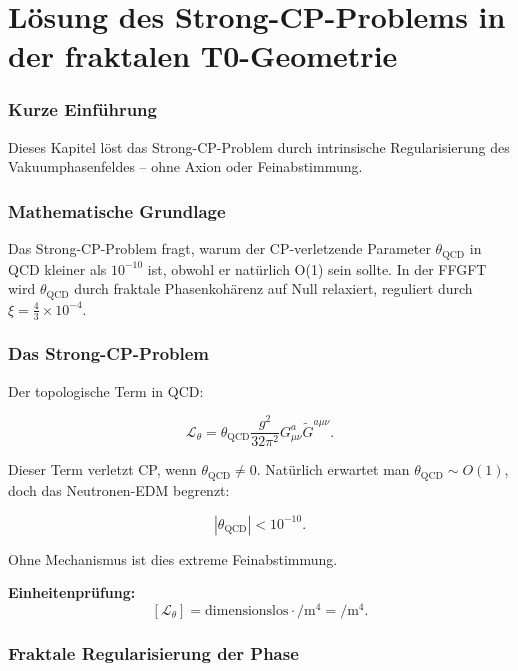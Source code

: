\chapter{Lösung des Strong-CP-Problems in der fraktalen T0-Geometrie}


	
	\subsection*{Kurze Einführung}
	
	Dieses Kapitel löst das Strong-CP-Problem durch intrinsische Regularisierung des Vakuumphasenfeldes – ohne Axion oder Feinabstimmung.
	
	\subsection*{Mathematische Grundlage}
	
	Das Strong-CP-Problem fragt, warum der CP-verletzende Parameter \(\theta_{\text{QCD}}\) in QCD kleiner als \(10^{-10}\) ist, obwohl er natürlich O(1) sein sollte. In der FFGFT wird \(\theta_{\text{QCD}}\) durch fraktale Phasenkohärenz auf Null relaxiert, reguliert durch \(\xi = \frac{4}{3} \times 10^{-4}\).
	
	\subsection*{Das Strong-CP-Problem}
	
	Der topologische Term in QCD:
	
	\begin{equation}
		\mathcal{L}_{\theta} = \theta_{\text{QCD}} \frac{g^2}{32\pi^2} G^a_{\mu\nu} \tilde{G}^{a\mu\nu}.
	\end{equation}
	
	Dieser Term verletzt CP, wenn \(\theta_{\text{QCD}} \neq 0\). Natürlich erwartet man \(\theta_{\text{QCD}} \sim O(1)\), doch das Neutronen-EDM begrenzt:
	
	\begin{equation}
		|\theta_{\text{QCD}}| < 10^{-10}.
	\end{equation}
	
	Ohne Mechanismus ist dies extreme Feinabstimmung.
	
	\textbf{Einheitenprüfung:}
	\[
	[\mathcal{L}_{\theta}] = \text{dimensionslos} \cdot \si{\per\meter\tothe{4}} = \si{\per\meter\tothe{4}}.
	\]
	
	\subsection*{Fraktale Regularisierung der Phase}
	

